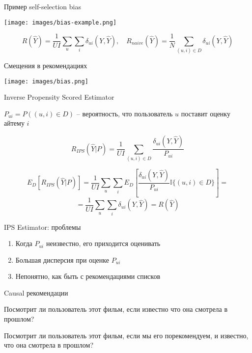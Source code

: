\documentclass[11pt,aspectratio=169,handout]{beamer}
\begin{document}
\begin{frame}{Пример self-selection bias}

\begin{center}
\texttt{[image: images/bias-example.png]}
\end{center}

\[
R(\hat Y) = \frac{1}{U I} \sum_u \sum_i \delta_{ui} (Y, \hat Y), \quad R_{naive}(\hat Y) = \frac{1}{N} \sum_{(u,i) \in D} \delta_{ui}(Y, \hat Y)
\]

\end{frame}

\begin{frame}{Смещения в рекомендациях \cite{BIAS}}

\begin{center}
\texttt{[image: images/bias.png]}
\end{center}

\end{frame}

\begin{frame}{Inverse Propensity Scored Estimator \cite{TREATMENTS}}

$P_{ui} = P((u, i) \in D)$ -- вероятность, что пользователь $u$ поставит оценку айтему $i$

\[
R_{IPS}(\hat Y | P) = \frac{1}{U I} \sum_{(u,i) \in D} \frac{\delta_{ui}(Y, \hat Y)}{P_{ui}}
\]

\[
E_D [R_{IPS}(\hat Y | P)] = \frac{1}{U I} \sum_u \sum_i E_D\left[ \frac{\delta_{ui}(Y, \hat Y)}{P_{ui}} \mathbb{I}\{(u, i) \in D\}\right] = 
\]
\[
= \frac{1}{U I} \sum_u \sum_i \delta_{ui} (Y, \hat Y) = R(\hat Y) 
\]

\end{frame}

\begin{frame}{IPS Estimator: проблемы}

\begin{enumerate}
\item Когда $P_{ui}$ неизвестно, его приходится оценивать
\item Большая дисперсия при оценке $P_{ui}$
\item Непонятно, как быть с рекомендациями списков
\end{enumerate}

\end{frame}

\begin{frame}{Causal рекомендации}

\begin{tcolorbox}[colback=warn!5,colframe=warn!80,title=Традиционный рекомендер]
Посмотрит ли пользователь этот фильм, если известно что она смотрела в прошлом?
\end{tcolorbox}

\begin{tcolorbox}[colback=info!5,colframe=info!80,title=Causal рекомендер]
Посмотрит ли пользователь этот фильм, если мы его порекомендуем, и известно, что она смотрела в прошлом?
\end{tcolorbox}

\end{frame}
\end{document}
